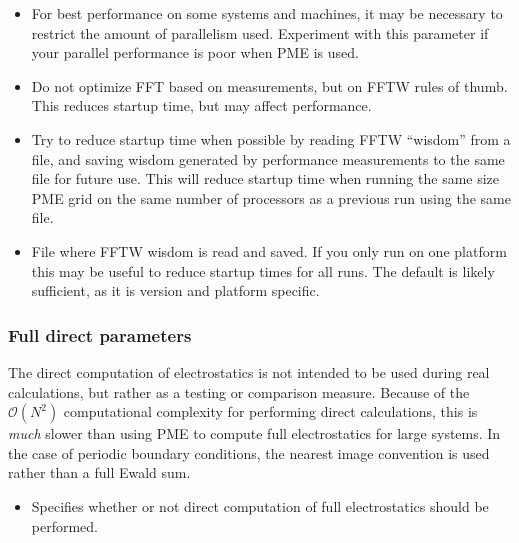 \begin{itemize}
\item
{}
{For best performance on some systems and machines, it may be necessary to
restrict the amount of parallelism used.  Experiment with this parameter if
your parallel performance is poor when PME is used.}

\item
{}
{Do not optimize FFT based on measurements, but on FFTW rules of thumb.
This reduces startup time, but may affect performance.}

\item
{}
{Try to reduce startup time when possible by reading FFTW ``wisdom'' from a file, and saving wisdom generated by performance measurements to the same file for future use.
This will reduce startup time when running the same size PME grid on the same number of processors as a previous run using the same file.}

\item
{}
{File where FFTW wisdom is read and saved.
If you only run on one platform this may be useful to reduce startup times for all runs.
The default is likely sufficient, as it is version and platform specific.}

\end{itemize}

\subsubsection{Full direct parameters}

The direct computation of electrostatics 
is not intended to be used during 
real calculations, but rather as a testing or 
comparison measure.  Because of the ${\mathcal O}(N^2)$ 
computational complexity for performing 
direct calculations, this is {\it much} 
slower than using PME to compute full 
electrostatics for large systems.
In the case of periodic boundary conditions,
the nearest image convention is used rather than a
full Ewald sum.

\begin{itemize}

\item
{}
{Specifies whether or not direct computation of 
full electrostatics should be performed.}

\end{itemize}



